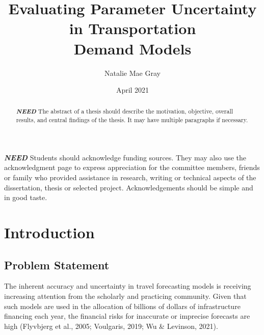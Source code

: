 \documentclass[fancy, masters,twoside]{byuthesis}
\title{Evaluating Parameter Uncertainty in Transportation\\
Demand Models}
\author{Natalie Mae Gray}
\date{April 2021}
\begin{document}
	\frontmatter

	\titlepage
	\cleardoublepage

	\customtitlepage
	\cleardoublepage


    \begin{abstract}
  \textbf{\emph{NEED}} The abstract of a thesis should describe the
  motivation, objective, overall results, and central findings of the thesis.
  It may have multiple paragraphs if necessary.
  \end{abstract}
  	\cleardoublepage


    \begin{acknowledgments}
  \textbf{\emph{NEED}} Students should acknowledge funding sources. They may also use the
  acknowledgment page to express appreciation for the committee members, friends
  or family who provided assistance in research, writing or technical aspects of
  the dissertation, thesis or selected project. Acknowledgements should be simple
  and in good taste.
  \end{acknowledgments}
  	\cleardoublepage

	\tableofcontents*
	\cleardoublepage

	\listoffigures
	\cleardoublepage

	\listoftables
	\cleardoublepage

	
	\cleardoublepage

	\mainmatter

\hypertarget{introduction}{%
\chapter{Introduction}\label{introduction}}

\hypertarget{problem-statement}{%
\section{Problem Statement}\label{problem-statement}}

The inherent accuracy and uncertainty in travel forecasting models is receiving increasing attention from the scholarly and practicing community. Given that such models are used in the allocation of billions of dollars of infrastructure financing each year, the financial risks for inaccurate or imprecise forecasts are high (Flyvbjerg et al., 2005; Voulgaris, 2019; Wu \& Levinson, 2021).
\end{document}
